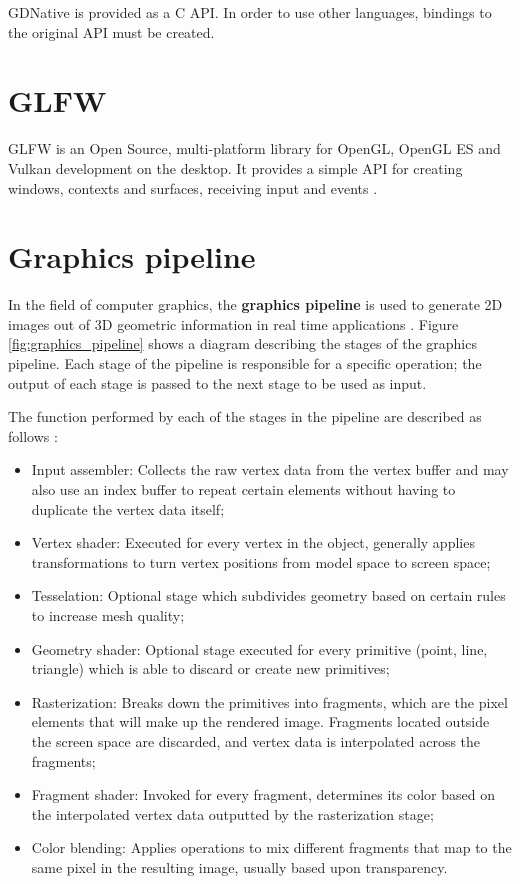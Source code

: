 GDNative is provided as a C API. In order to use other languages, bindings to the original API must be created.

\section{GLFW}
GLFW is an Open Source, multi-platform library for OpenGL, OpenGL ES and Vulkan development on the desktop. It provides a simple API for creating windows, contexts and surfaces, receiving input and events \cite{glfw}.

\section{Graphics pipeline}
In the field of computer graphics, the \textbf{graphics pipeline} is used to generate 2D images out of 3D geometric information in real time applications \cite{shirley_fcg:2002}. Figure \ref{fig:graphics_pipeline} shows a diagram describing the stages of the graphics pipeline. Each stage of the pipeline is responsible for a specific operation; the output of each stage is passed to the next stage to be used as input.

The function performed by each of the stages in the pipeline are described as follows \cite{vulkan_tutorial}:

\begin{itemize}
    \item Input assembler: Collects the raw vertex data from the vertex buffer and may also use an index buffer to repeat certain elements without having to duplicate the vertex data itself;
    \item Vertex shader: Executed for every vertex in the object, generally applies transformations to turn vertex positions from model space to screen space;
    \item Tesselation: Optional stage which subdivides geometry based on certain rules to increase mesh quality;
    \item Geometry shader: Optional stage executed for every primitive (point, line, triangle) which is able to discard or create new primitives;
    \item Rasterization: Breaks down the primitives into fragments, which are the pixel elements that will make up the rendered image. Fragments located outside the screen space are discarded, and vertex data is interpolated across the fragments;
    \item Fragment shader: Invoked for every fragment, determines its color based on the interpolated vertex data outputted by the rasterization stage;
    \item Color blending: Applies operations to mix different fragments that map to the same pixel in the resulting image, usually based upon transparency.
\end{itemize}

